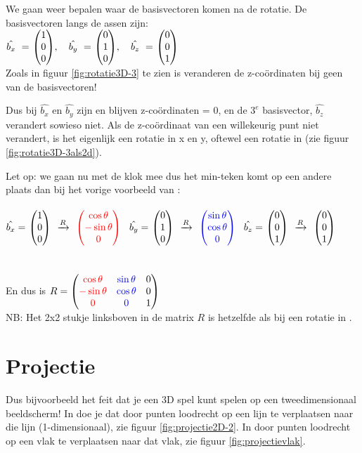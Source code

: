 We gaan weer bepalen waar de basisvectoren komen na de rotatie. De basisvectoren langs de assen zijn: \\
$ \hat{b_x} \ = \ \vecdrie{1}{0}{0}, \quad \hat{b_y} \ = \ \vecdrie{0}{1}{0},  \quad \hat{b_z} \ = \ \vecdrie{0}{0}{1} $ \\
Zoals in figuur \ref{fig:rotatie3D-3} te zien is veranderen de z-coördinaten bij geen van de basisvectoren! 
\newpage
{}

Dus bij  $ \hat{b_x} $ en $  \hat{b_y} $  zijn en blijven z-coördinaten = 0, en de $ 3^e $ basisvector, $  \hat{b_z} $  verandert sowieso niet. Als de z-coördinaat van een willekeurig punt niet verandert, is het eigenlijk een rotatie in x en y, oftewel een rotatie in \RT (zie figuur \ref{fig:rotatie3D-3als2d}).  

Let op: we gaan nu met de klok mee dus het min-teken komt op een andere plaats dan bij het vorige voorbeeld van \RT: \\ \\
$ \hat{b_x}  = \ \vecdrie{1}{0}{0}  \ \  \xrightarrow{R} \ \  \vecdrie[red]{\cos \theta}{- \sin \theta}{0}\ $  
\qquad  $ \hat{b_y}  = \ \vecdrie{0}{1}{0}  \ \  \xrightarrow{R}  \ \ \vecdrie[blue]{\sin \theta}{ \cos \theta}{0}\ $  
\qquad  $ \hat{b_z}  = \ \vecdrie{0}{0}{1}   \  \  \xrightarrow{R}  \ \ \vecdrie{0}{0}{1}\ $  \\ \\ \\
En dus is $ R = 
\begin{pmatrix} {\color{red}\cos \theta} & {\color{blue}\sin \theta} & {0}  \\ {\color{red}- \sin \theta} & {\color{blue}\cos \theta} & {0} \\ {\color{red}0} & {\color{blue}0} & {1} \end{pmatrix} $ \\ 
NB: Het 2x2 stukje linksboven in de matrix $ R $ is hetzelfde als bij een rotatie in \RT.

\section{Projectie}		
  Dus bijvoorbeeld het feit dat je een 3D spel kunt spelen op een tweedimensionaal beeldscherm! In \RT doe je dat door punten loodrecht op een lijn te verplaatsen naar die lijn (1-dimensionaal), zie figuur \ref{fig:projectie2D-2}. In \RD door punten loodrecht op een vlak te verplaatsen naar dat vlak, zie figuur \ref{fig:projectievlak}.
